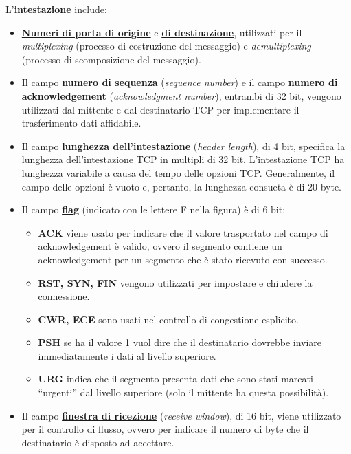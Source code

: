 \documentclass[a4paper]{article}
\newcommand{\dquotes}[1]{``#1''}
\begin{document}
	\noindent
	L'\textbf{intestazione} include:
	\begin{itemize}
		\item \textbf{\underline{Numeri di porta di origine}} e \textbf{\underline{di destinazione}}, utilizzati per il \emph{multiplexing} (processo di costruzione del messaggio) e \emph{demultiplexing} (processo di scomposizione del messaggio).
		
		\item Il campo \textbf{\underline{numero di sequenza}} (\emph{sequence number}) e il campo \textbf{numero di acknowledgement} (\emph{acknowledgment number}), entrambi di 32 bit, vengono utilizzati dal mittente e dal destinatario TCP per implementare il trasferimento dati affidabile.
		
		\item Il campo \textbf{\underline{lunghezza dell'intestazione}} (\emph{header length}), di 4 bit, specifica la lunghezza dell’intestazione TCP in multipli di 32 bit. L’intestazione TCP ha lunghezza variabile a causa del tempo delle opzioni TCP. Generalmente, il campo delle opzioni è vuoto e, pertanto, la lunghezza consueta è di 20 byte.
		
		\item Il campo \textbf{\underline{flag}} (indicato con le lettere F nella figura) è di 6 bit:
		\begin{itemize}
			\item \textbf{ACK} viene usato per indicare che il valore trasportato nel campo di acknowledgement è valido, ovvero il segmento contiene un acknowledgement per un segmento che è stato ricevuto con successo.
			
			\item \textbf{RST, SYN, FIN} vengono utilizzati per impostare e chiudere la connessione.
			
			\item \textbf{CWR, ECE} sono usati nel controllo di congestione esplicito.
			
			\item \textbf{PSH} se ha il valore 1 vuol dire che il destinatario dovrebbe inviare immediatamente i dati al livello superiore.
			
			\item \textbf{URG} indica che il segmento presenta dati che sono stati marcati \dquotes{urgenti} dal livello superiore (solo il mittente ha questa possibilità).
		\end{itemize}
	
		\item Il campo \textbf{\underline{finestra di ricezione}} (\emph{receive window}), di 16 bit, viene utilizzato per il controllo di flusso, ovvero per indicare il numero di byte che il destinatario è disposto ad accettare.
		

\end{itemize}
\end{document}
